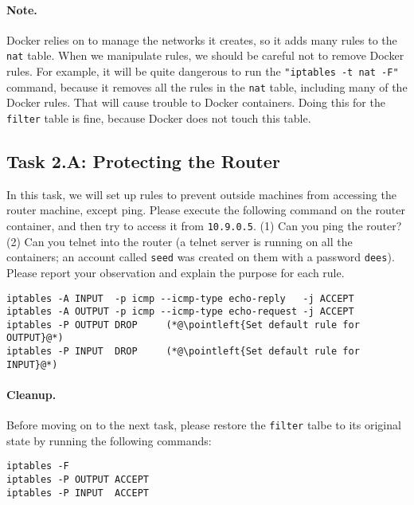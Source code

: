 \paragraph{Note.} Docker relies on \iptables to manage 
the networks it creates, so it adds many rules to 
the \texttt{nat} table. 
When we manipulate \iptables rules, we should be careful 
not to remove Docker rules. For example, it will be quite
dangerous to run the \texttt{"iptables -t nat -F"} command, because 
it removes all the rules in the \texttt{nat} table,
including many of the Docker rules. That will cause 
trouble to Docker containers. Doing this for 
the \texttt{filter} table is fine, because Docker 
does not touch this table. 


\subsection{Task 2.A: Protecting the Router} 

In this task, we will set up rules to prevent outside machines from 
accessing the router machine, except ping.   
Please execute the following \iptables
command on the router container, and then try to 
access it from \texttt{10.9.0.5}. (1) Can you ping 
the router? (2) Can you telnet into the router (a 
telnet server is running on all the containers; an
account called \texttt{seed} was created on them with
a password \texttt{dees}). 
Please report your observation and explain the purpose for 
each rule. 

\begin{lstlisting}
iptables -A INPUT  -p icmp --icmp-type echo-reply   -j ACCEPT
iptables -A OUTPUT -p icmp --icmp-type echo-request -j ACCEPT
iptables -P OUTPUT DROP     (*@\pointleft{Set default rule for OUTPUT}@*)
iptables -P INPUT  DROP     (*@\pointleft{Set default rule for INPUT}@*)
\end{lstlisting}
 

\paragraph{Cleanup.} 
Before moving on to the next task, please restore the \texttt{filter} 
talbe to its original state by running the following commands:

\begin{lstlisting}
iptables -F
iptables -P OUTPUT ACCEPT
iptables -P INPUT  ACCEPT
\end{lstlisting}
 
